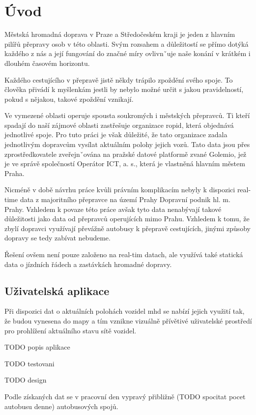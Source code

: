 \chapter*{Úvod}

Městská hromadná doprava v Praze a Středočeském kraji je jeden z hlavním pilířů přepravy osob v této oblasti. Svým rozsahem a důležitostí se přímo dotýká každého z nás a její fungování do značné míry ovlivnˇuje naše konání v krátkém i dlouhém časovém horizontu.

\bigbreak

Každého cestujícího v přepravě jistě někdy trápilo zpoždění svého spoje. To člověka přivádí k myšlenkám jestli by nebylo možné určit s jakou pravidelností, pokud s nějakou, takové zpoždění vznikají.

\bigbreak

Ve vymezené oblasti operuje spousta soukromých i městských přepravců. Ti kteří spadají do naší zájmové oblasti zastřešuje organizace \gls{ropid}, která objednává jednotlivé spoje. Pro tuto práci je však důležité, že tato organizace zadala jednotlivým dopravcům vysílat aktuálním polohy jejich vozů. Tato data jsou přes zprostředkovatele zveřejnˇována na pražské datové platformě zvané Golemio, jež je ve správě společností Operátor ICT, a. s., která je vlastněná hlavním městem Praha.

\bigbreak

Nicméně v době návrhu práce kvůli právním komplikacím nebyly k dispozici real-time data z majoritního přepravce na území Prahy Dopravní podnik hl. m. Prahy. Vzhledem k povaze této práce avšak tyto data nenabývají takové důležitosti jako data od přepravců operujících mimo Prahu. Vzhledem k tomu, že zbylí dopravci využívají převážně autobusy k přepravě cestujících, jinými způsoby dopravy se tedy zabívat nebudeme.

\bigbreak

Řešení ovšem není pouze založeno na real-tim datach, ale využívá také statická data o jízdních řádech a zastávkách hromadné dopravy.

\section*{Uživatelská aplikace}

Při dispozici dat o aktuálních polohách vozidel \gls{mhd} se nabízí jejich využití tak, že budou vynesena do mapy a tím vznikne vizuálně přívětivé uživatelské prostředí pro prohlížení aktuálního stavu sítě vozidel.

\bigbreak

TODO popis aplikace

TODO testovani

TODO design




Podle získaných dat se v pracovní den vypravý přibližně (TODO spocitat pocet autobusu denne) autobusových spojů.
